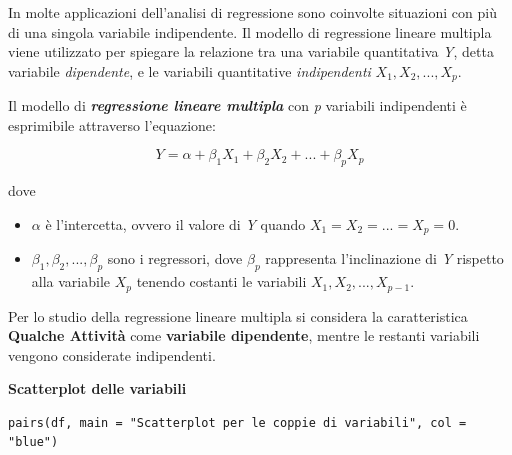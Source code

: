 In molte applicazioni dell'analisi di regressione sono coinvolte situazioni con più di una singola variabile indipendente. Il modello di regressione lineare multipla viene utilizzato per spiegare la relazione tra una variabile quantitativa \textit{Y}, detta variabile \textit{dipendente}, e le variabili quantitative \textit{indipendenti} $X_1, X_2, ..., X_p$.

Il modello di \textbf{\textit{regressione lineare multipla}} con \textit{p} variabili indipendenti è esprimibile attraverso l'equazione:

\[Y = \alpha + \beta_1 X_1 + \beta_2 X_2 + ... + \beta_p X_p\]

dove 

\begin{itemize}
    \item $\alpha$ è l'intercetta, ovvero il valore di \textit{Y} quando $X_1 = X_2 = ... = X_p = 0$.
    \item $\beta_1, \beta_2, ..., \beta_p$ sono i regressori, dove $\beta_p$ rappresenta l'inclinazione di \textit{Y} rispetto alla variabile $X_p$ tenendo costanti le variabili $X_1, X_2, ..., X_{p-1}$.
\end{itemize}

Per lo studio della regressione lineare multipla si considera la caratteristica \textbf{Qualche Attività} come \textbf{variabile dipendente}, mentre le restanti variabili vengono considerate indipendenti.

\noindent \textbf{Scatterplot delle variabili}

\vspace{5mm}
\begin{lstlisting}
pairs(df, main = "Scatterplot per le coppie di variabili", col = "blue")
\end{lstlisting}
\vspace{5mm}

